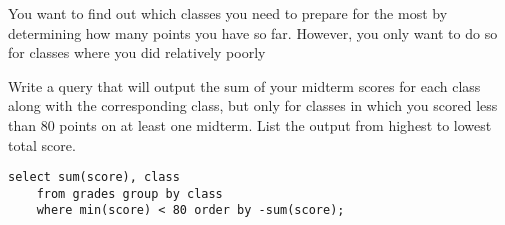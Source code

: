 \begin{blocksection}
\question 
You want to find out which classes you need to prepare for the most by determining how many points you have so far. However, you only want to do so for classes where you did relatively poorly

Write a query that will output the sum of your midterm scores for each class along with the corresponding class, but only for classes in which you scored less than 80 points on at least one midterm. List the output from highest to lowest total score.

\begin{solution}[1.5in]
\begin{lstlisting}
select sum(score), class
    from grades group by class
    where min(score) < 80 order by -sum(score);
\end{lstlisting}
\end{solution}
\end{blocksection}